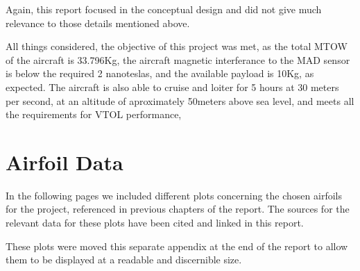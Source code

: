 \documentclass[english,fira]{ist-report}
\begin{document}
Again, this report focused in the conceptual design and did not give much relevance to those details mentioned above. 

All things considered, the objective of this project was met, as the total MTOW of the aircraft is 33.796Kg, the aircraft magnetic interferance to the MAD sensor is below the required 2 nanoteslas, and the available payload is 10Kg, as expected. The aircraft is also able to cruise and loiter for 5 hours at 30 meters per second, at an altitude of aproximately 50meters above sea level, and meets all the requirements for VTOL performance, 


\appendix


\chapter{Airfoil Data}

In the following pages we included different plots concerning the chosen airfoils for the project, referenced in previous chapters of the report. The sources for the relevant data for these plots have been cited and linked in this report.

These plots were moved this separate appendix at the end of the report to allow them to be displayed at a readable and discernible size.

\end{document}
